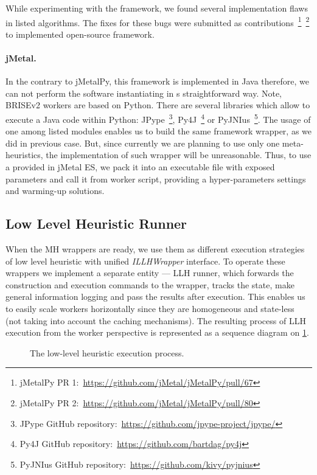 While experimenting with the framework, we found several implementation flaws in listed algorithms. The fixes for these bugs were submitted as contributions~\footnote{jMetalPy PR 1:~\url{https://github.com/jMetal/jMetalPy/pull/67}}~\footnote{jMetalPy PR 2:~\url{https://github.com/jMetal/jMetalPy/pull/80}} to implemented open-source framework.

\paragraph{jMetal.} In the contrary to jMetalPy, this framework is implemented in Java therefore, we can not perform the software instantiating in s straightforward way. Note, BRISEv2 workers are based on Python. There are several libraries which allow to execute a Java code within Python: JPype~\footnote{JPype GitHub repository:~\url{https://github.com/jpype-project/jpype/}}, Py4J~\footnote{Py4J GitHub repository:~\url{https://github.com/bartdag/py4j}} or PyJNIus~\footnote{PyJNIus GitHub repository:~\url{https://github.com/kivy/pyjnius}}. The usage of one among listed modules enables us to build the same framework wrapper, as we did in previous case. But, since currently we are planning to use only one meta-heuristics, the implementation of such wrapper will be unreasonable. Thus, to use a provided in jMetal ES, we pack it into an executable file with exposed parameters and call it from worker script, providing a hyper-parameters settings and warming-up solutions.

\subsection{Low Level Heuristic Runner}
When the MH wrappers are ready, we use them as different execution strategies of low level heuristic with unified \emph{ILLHWrapper} interface. To operate these wrappers we implement a separate entity — LLH runner, which forwards the construction and execution commands to the wrapper, tracks the state, make general information logging and pass the results after execution. This enables us to easily scale workers horizontally since they are homogeneous and state-less (not taking into account the caching mechanisms). The resulting process of LLH execution from the worker perspective is represented as a sequence diagram on \cref{impl:pict:llh sequence diagram}.

\begin{figure}
	\centering
	
	\caption{The low-level heuristic execution process.}
	\label{impl:pict:llh sequence diagram}
\end{figure}

